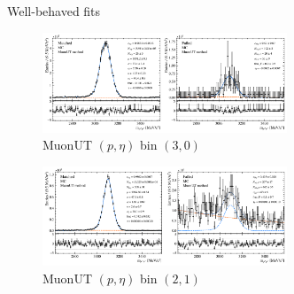 \documentclass[xcolor={dvipsnames}]{beamer}
\begin{document}
\begin{frame}{Well-behaved fits}
  \vspace{0.0cm}
  \begin{figure}[htb]
    \centering
    \includegraphics[width=0.65\textwidth]{Plots/MC_MuonUT_P_bin_3_ETA_bin_0_sim.pdf}
    \caption*{\small MuonUT $(p, \eta)$ bin $(3, 0)$}
  \end{figure}
  \vspace{-0.5cm}
  \begin{figure}[htb]
    \centering
    \includegraphics[width=0.65\textwidth]{Plots/MC_MuonUT_P_bin_2_ETA_bin_1_sim.pdf}
    \caption*{\small MuonUT $(p, \eta)$ bin $(2, 1)$}
  \end{figure}
\end{frame}
\end{document}
